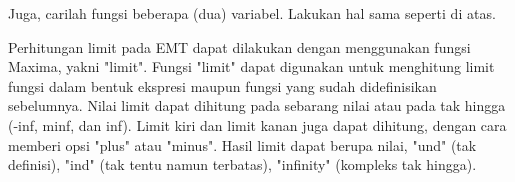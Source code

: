 \documentclass[a4paper,10pt]{article}
\begin{document}
\begin{eulernotebook}
\begin{eulercomment}
\begin{eulercomment}
\begin{eulercomment}
\begin{eulercomment}
\begin{eulercomment}
\begin{eulercomment}
\begin{eulercomment}
\begin{eulercomment}
\begin{eulercomment}
\begin{eulercomment}
\begin{eulercomment}
\begin{eulercomment}
\begin{eulercomment}
\begin{eulercomment}
\begin{eulercomment}
\begin{eulercomment}
\begin{eulercomment}
Juga, carilah fungsi beberapa (dua) variabel. Lakukan hal sama seperti
di atas.
\end{eulercomment}
\begin{eulercomment}

\begin{eulercomment}
\begin{eulercomment}
Perhitungan limit pada EMT dapat dilakukan dengan menggunakan fungsi
Maxima, yakni "limit". Fungsi "limit" dapat digunakan untuk menghitung
limit fungsi dalam bentuk ekspresi maupun fungsi yang sudah
didefinisikan sebelumnya. Nilai limit dapat dihitung pada sebarang
nilai atau pada tak hingga (-inf, minf, dan inf). Limit kiri dan limit
kanan juga dapat dihitung, dengan cara memberi opsi "plus" atau
"minus". Hasil limit dapat berupa nilai, "und" (tak definisi), "ind"
(tak tentu namun terbatas), "infinity" (kompleks tak hingga).


\end{eulercomment}
\end{eulercomment}
\end{eulercomment}
\end{eulercomment}
\end{eulercomment}
\end{eulercomment}
\end{eulercomment}
\end{eulercomment}
\end{eulercomment}
\end{eulercomment}
\end{eulercomment}
\end{eulercomment}
\end{eulercomment}
\end{eulercomment}
\end{eulercomment}
\end{eulercomment}
\end{eulercomment}
\end{eulercomment}
\end{eulercomment}
\end{eulernotebook}
\end{document}
